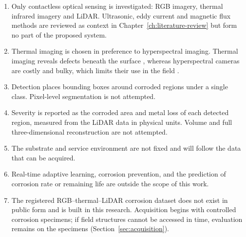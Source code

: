 \begin{enumerate}[label=\arabic*),leftmargin=*,itemsep=5pt]
  \item Only contactless optical sensing is investigated: RGB imagery, thermal
        infrared imagery and LiDAR. Ultrasonic, eddy current and magnetic flux
        methods are reviewed as context in Chapter~\ref{ch:literature-review}
        but form no part of the proposed system.
  \item Thermal imaging is chosen in preference to hyperspectral imaging.
        Thermal imaging reveals defects beneath the surface
        \citep{Lim2021,Li2024c,Guedes2025}, whereas hyperspectral cameras are
        costly and bulky, which limits their use in the field \citep{Tang2025}.
  \item Detection places bounding boxes around corroded regions under a single
        class. Pixel-level segmentation is not attempted.
  \item Severity is reported as the corroded area and metal loss of each
        detected region, measured from the LiDAR data in physical units.
        Volume and full three-dimensional reconstruction are not attempted.
  \item The substrate and service environment are not fixed and will follow
        the data that can be acquired.
  \item Real-time adaptive learning, corrosion prevention, and the prediction
        of corrosion rate or remaining life are outside the scope of this work.
  \item The registered RGB--thermal--LiDAR corrosion dataset does not exist in
        public form and is built in this research. Acquisition begins with
        controlled corrosion specimens; if field structures cannot be accessed
        in time, evaluation remains on the specimens
        (Section~\ref{sec:acquisition}).
\end{enumerate}
